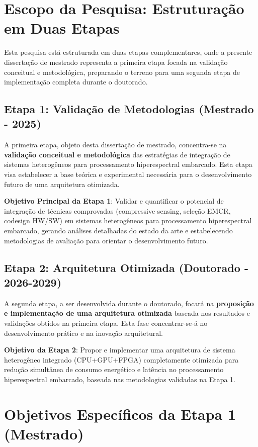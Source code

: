 \section{Escopo da Pesquisa: Estruturação em Duas Etapas}

Esta pesquisa está estruturada em duas etapas complementares, onde a presente dissertação de mestrado representa a primeira etapa focada na validação conceitual e metodológica, preparando o terreno para uma segunda etapa de implementação completa durante o doutorado.

\subsection{Etapa 1: Validação de Metodologias (Mestrado - 2025)}

A primeira etapa, objeto desta dissertação de mestrado, concentra-se na \textbf{validação conceitual e metodológica} das estratégias de integração de sistemas heterogêneos para processamento hiperespectral embarcado. Esta etapa visa estabelecer a base teórica e experimental necessária para o desenvolvimento futuro de uma arquitetura otimizada.

\textbf{Objetivo Principal da Etapa 1}: Validar e quantificar o potencial de integração de técnicas comprovadas (compressive sensing, seleção EMCR, codesign HW/SW) em sistemas heterogêneos para processamento hiperespectral embarcado, gerando análises detalhadas do estado da arte e estabelecendo metodologias de avaliação para orientar o desenvolvimento futuro.

\subsection{Etapa 2: Arquitetura Otimizada (Doutorado - 2026-2029)}

A segunda etapa, a ser desenvolvida durante o doutorado, focará na \textbf{proposição e implementação de uma arquitetura otimizada} baseada nos resultados e validações obtidos na primeira etapa. Esta fase concentrar-se-á no desenvolvimento prático e na inovação arquitetural.

\textbf{Objetivo da Etapa 2}: Propor e implementar uma arquitetura de sistema heterogêneo integrado (CPU+GPU+FPGA) completamente otimizada para redução simultânea de consumo energético e latência no processamento hiperespectral embarcado, baseada nas metodologias validadas na Etapa 1.

\section{Objetivos Específicos da Etapa 1 (Mestrado)}


